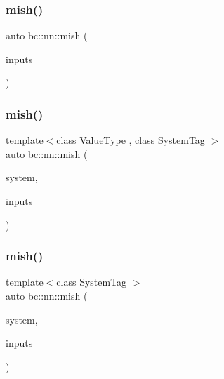 \mbox{\label{namespacebc_1_1nn_a4caea62ecbd9888f7d0a77661a2e7832}} 
\subsubsection{\texorpdfstring{mish()}{mish()}\hspace{0.1cm}{\footnotesize\ttfamily [1/5]}}
{\footnotesize\ttfamily auto bc\+::nn\+::mish (\begin{DoxyParamCaption}\item[{\hyperlink{namespacebc_aaf8e3fbf99b04b1b57c4f80c6f55d3c5}{bc\+::size\+\_\+t}}]{inputs }\end{DoxyParamCaption})}

\mbox{\label{namespacebc_1_1nn_aa3c0961368fefa7b538affb32f1e4e05}} 
\subsubsection{\texorpdfstring{mish()}{mish()}\hspace{0.1cm}{\footnotesize\ttfamily [2/5]}}
{\footnotesize\ttfamily template$<$class Value\+Type , class System\+Tag $>$ \\
auto bc\+::nn\+::mish (\begin{DoxyParamCaption}\item[{System\+Tag}]{system,  }\item[{\hyperlink{namespacebc_aaf8e3fbf99b04b1b57c4f80c6f55d3c5}{bc\+::size\+\_\+t}}]{inputs }\end{DoxyParamCaption})}

\mbox{\label{namespacebc_1_1nn_abf3d50f04ead7ada621648fc8ef0dbdc}} 
\subsubsection{\texorpdfstring{mish()}{mish()}\hspace{0.1cm}{\footnotesize\ttfamily [3/5]}}
{\footnotesize\ttfamily template$<$class System\+Tag $>$ \\
auto bc\+::nn\+::mish (\begin{DoxyParamCaption}\item[{System\+Tag}]{system,  }\item[{\hyperlink{namespacebc_aaf8e3fbf99b04b1b57c4f80c6f55d3c5}{bc\+::size\+\_\+t}}]{inputs }\end{DoxyParamCaption})}

